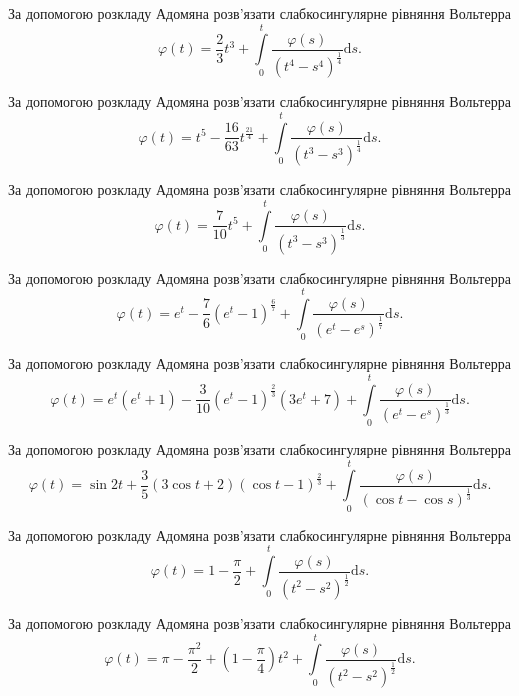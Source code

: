\documentclass[12pt]{extarticle}
\begin{document}
\begin{Exercise}
За допомогою розкладу Адомяна розв’язати слабкосингулярне рівняння Вольтерра \[\varphi(t) = \dfrac{2}{3} t^3 + \int\limits_{0}^{t} \dfrac{\varphi(s)}{(t^4 - s^4)^\frac{1}{4}} \mathrm{d}s.\]
\end{Exercise}

\begin{Exercise}
За допомогою розкладу Адомяна розв’язати слабкосингулярне рівняння Вольтерра \[\varphi(t) = t^5 - \dfrac{16}{63}t^{\frac{21}{4}} + \int\limits_{0}^{t} \dfrac{\varphi(s)}{(t^3 - s^3)^\frac{1}{4}} \mathrm{d}s.\]
\end{Exercise}

\begin{Exercise}
За допомогою розкладу Адомяна розв’язати слабкосингулярне рівняння Вольтерра \[\varphi(t) = \dfrac{7}{10}t^5 + \int\limits_{0}^{t} \dfrac{\varphi(s)}{(t^3 - s^3)^\frac{1}{3}} \mathrm{d}s.\]
\end{Exercise}

\begin{Exercise}
За допомогою розкладу Адомяна розв’язати слабкосингулярне рівняння Вольтерра \[\varphi(t) = e^t - \dfrac{7}{6}\left(e^t - 1\right)^\frac{6}{7} + \int\limits_{0}^{t} \dfrac{\varphi(s)}{\left(e^t - e^s\right)^\frac{1}{7}} \mathrm{d}s.\]
\end{Exercise}

\begin{Exercise}
За допомогою розкладу Адомяна розв’язати слабкосингулярне рівняння Вольтерра \[\varphi(t) = e^t (e^t+1) - \dfrac{3}{10}\left(e^t - 1\right)^\frac{2}{3}(3e^t+7) + \int\limits_{0}^{t} \dfrac{\varphi(s)}{\left(e^t - e^s\right)^\frac{1}{3}} \mathrm{d}s.\]
\end{Exercise}

\begin{Exercise}
За допомогою розкладу Адомяна розв’язати слабкосингулярне рівняння Вольтерра \[\varphi(t) = \sin 2t + \dfrac{3}{5}\left(3 \cos t + 2\right)(\cos t - 1)^\frac{2}{3} + \int\limits_{0}^{t} \dfrac{\varphi(s)}{\left(\cos t - \cos s\right)^\frac{1}{3}} \mathrm{d}s.\]
\end{Exercise}

\begin{Exercise}
За допомогою розкладу Адомяна розв’язати слабкосингулярне рівняння Вольтерра \[\varphi(t) = 1 - \dfrac{\pi}{2} + \int\limits_{0}^{t} \dfrac{\varphi(s)}{\left(t^2 - s^2\right)^\frac{1}{2}} \mathrm{d}s.\]
\end{Exercise}

\begin{Exercise}
За допомогою розкладу Адомяна розв’язати слабкосингулярне рівняння Вольтерра \[\varphi(t) = \pi - \dfrac{\pi^2}{2} + \left(1-\dfrac{\pi}{4}\right) t^2 + \int\limits_{0}^{t} \dfrac{\varphi(s)}{\left(t^2 - s^2\right)^\frac{1}{2}} \mathrm{d}s.\]
\end{Exercise}
\end{document}
